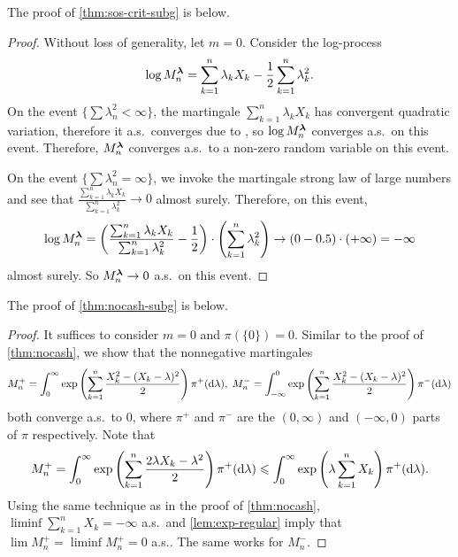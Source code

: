 The proof of \cref{thm:sos-crit-subg} is below.
\begin{proof}
    Without loss of generality, let $m=0$. Consider the log-process
    \begin{equation}\label{eqn:log-subg}
        \log M_n^{\boldsymbol{\lambda}} = \sum_{k=1}^n \lambda_k X_k - \frac{1}{2} \sum_{k=1}^n \lambda_k^2.
    \end{equation}
    On the event $\{ \sum \lambda_n^2 < \infty \}$, the martingale $\sum_{k=1}^n \lambda_k X_k$ has convergent quadratic variation, therefore it a.s.\ converges due to \citet[Theorem 2.15]{hall2014martingale}, so $\log  M_n^{\boldsymbol{\lambda}}$ converges a.s.\ on this event. Therefore, $M_n^{\boldsymbol{\lambda}}$ converges a.s.\ to a non-zero random variable on this event.

    On the event $\{ \sum \lambda_n^2 = \infty \}$, we invoke the martingale strong law of large numbers \citep[Theorem 3]{Fitzsimmonslecturenotes} and see that $\frac{\sum_{k=1}^n \lambda_k X_k}{\sum_{k=1}^n \lambda_k^2} \to 0$ almost surely. Therefore, on this event,
    \begin{equation}
          \log M_n^{\boldsymbol{\lambda}} = \left(\frac{\sum_{k=1}^n \lambda_k X_k}{\sum_{k=1}^n \lambda_k^2} - \frac{1}{2}\right)\cdot\left({\sum_{k=1}^n \lambda_k^2}\right) \to (0-0.5)\cdot(+\infty) = -\infty
    \end{equation}
    almost surely. So $M_n^{\boldsymbol{\lambda}} \to 0$ a.s.\ on this event.
\end{proof}
The proof of \cref{thm:nocash-subg} is below.
\begin{proof}
    It suffices to consider $m = 0$ and $\pi(\{ 0 \}) = 0$. Similar to the proof of \cref{thm:nocash}, we show that the nonnegative martingales
    \begin{equation}
        M_n^+ = \int_0^\infty\exp\left(\sum_{k=1}^n \frac{X_k^2 - (X_k - \lambda)^2}{2} \right) \pi^+(\mathrm{d} \lambda), \;  M_n^- = \int_{-\infty}^0\exp\left(\sum_{k=1}^n \frac{X_k^2 - (X_k - \lambda)^2}{2} \right) \pi^-(\mathrm{d} \lambda)
    \end{equation}
    both converge a.s.\ to 0, where $\pi^+$ and $\pi^-$ are the $(0,\infty)$ and $(-\infty,0)$ parts of $\pi$ respectively. Note that
    \begin{equation}
        M_n^+ = \int_0^\infty\exp\left(\sum_{k=1}^n \frac{2 \lambda X_k - \lambda^2}{2} \right) \pi^+(\mathrm{d} \lambda) \leqslant \int_0^\infty\exp\left(\lambda \sum_{k=1}^n X_k \right) \pi^+(\mathrm{d} \lambda).
    \end{equation}
    Using the same technique as in the proof of \cref{thm:nocash}, $\liminf \sum_{k=1}^n X_k = -\infty$ a.s.\ and \cref{lem:exp-regular} imply that $\lim M_n^+ = \liminf M_n^+ = 0$ a.s.. The same works for $M_n^-$.
\end{proof}



